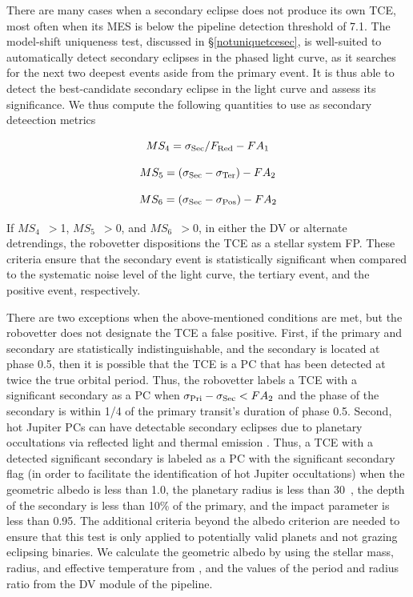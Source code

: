 There are many cases when a secondary eclipse does not produce its own TCE, most often when its MES is below the \kepler{} pipeline detection threshold of 7.1. The model-shift uniqueness test, discussed in \S\ref{notuniquetcesec}, is well-suited to automatically detect secondary eclipses in the phased light curve, as it searches for the next two deepest events aside from the primary event. It is thus able to detect the best-candidate secondary eclipse in the light curve and assess its significance. We thus compute the following quantities to use as secondary deteection metrics

\begin{equation}
    MS_{4} = \sigma_{\rm Sec}/F_{\rm Red} - FA_{1}
\end{equation}

\begin{equation}
    MS_{5} = (\sigma_{\rm Sec} - \sigma_{\rm Ter}) - FA_{2}
\end{equation}

\begin{equation}
    MS_{6} = (\sigma_{\rm Sec} - \sigma_{\rm Pos}) - FA_{2}
\end{equation}

If $MS_{4}$~$>$1, $MS_{5}$~$>$0, and $MS_{6}$~$>$0, in either the DV or alternate detrendings, the robovetter dispositions the TCE as a stellar system FP. These criteria ensure that the secondary event is statistically significant when compared to the systematic noise level of the light curve, the tertiary event, and the positive event, respectively.

There are two exceptions when the above-mentioned conditions are met, but the robovetter does not designate the TCE a false positive. First, if the primary and secondary are statistically indistinguishable, and the secondary is located at phase 0.5, then it is possible that the TCE is a PC that has been detected at twice the true orbital period. Thus, the robovetter labels a TCE with a significant secondary as a PC when ${\sigma_{\rm Pri} - \sigma_{\rm Sec} < FA_{2}}$ and the phase of the secondary is within 1/4 of the primary transit's duration of phase 0.5. Second, hot Jupiter PCs can have detectable secondary eclipses due to planetary occultations via reflected light and thermal emission \citep{Coughlin2012}. Thus, a TCE with a detected significant secondary is labeled as a PC with the significant secondary flag (in order to facilitate the identification of hot Jupiter occultations) when the geometric albedo is less than 1.0, the planetary radius is less than 30~\re{}, the depth of the secondary is less than 10\% of the primary, and the impact parameter is less than 0.95. The additional criteria beyond the albedo criterion are needed to ensure that this test is only applied to potentially valid planets and not grazing eclipsing binaries. We calculate the geometric albedo by using the stellar mass, radius, and effective temperature from \citet{Huber2014a}, and the values of the period and radius ratio from the DV module of the \kepler{} pipeline.



